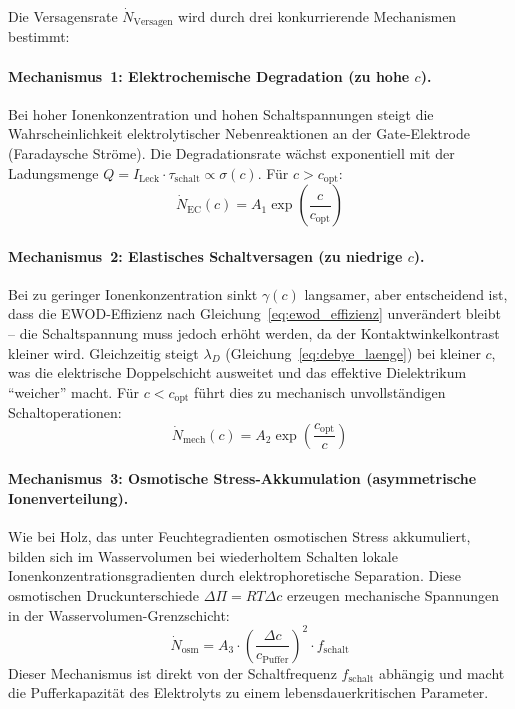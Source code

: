 ﻿\documentclass[a4paper,12pt]{scrreprt}
\theoremstyle{definition}
\begin{document}
Die Versagensrate $\dot{N}_{\mathrm{Versagen}}$ wird durch drei konkurrierende
Mechanismen bestimmt:

\paragraph{Mechanismus~1: Elektrochemische Degradation (zu hohe $c$).}
Bei hoher Ionenkonzentration und hohen Schaltspannungen steigt die Wahrscheinlichkeit
elektrolytischer Nebenreaktionen an der Gate-Elektrode (Faradaysche Ströme).
Die Degradationsrate wächst exponentiell mit der Ladungsmenge
$Q = I_{\mathrm{Leck}} \cdot \tau_{\mathrm{schalt}} \propto \sigma(c)$. Für $c > c_{\mathrm{opt}}$:
\begin{equation}
	\dot{N}_{\mathrm{EC}}(c) = A_1 \exp\!\left(\frac{c}{c_{\mathrm{opt}}}\right)
	\label{eq:versagen_ec}
\end{equation}

\paragraph{Mechanismus~2: Elastisches Schaltversagen (zu niedrige $c$).}
Bei zu geringer Ionenkonzentration sinkt $\gamma(c)$ langsamer, aber
entscheidend ist, dass die EWOD-Effizienz nach Gleichung~\eqref{eq:ewod_effizienz}
unverändert bleibt -- die Schaltspannung muss jedoch erhöht werden, da
der Kontaktwinkelkontrast kleiner wird. Gleichzeitig steigt $\lambda_D$
(Gleichung~\eqref{eq:debye_laenge}) bei kleiner $c$, was die elektrische
Doppelschicht ausweitet und das effektive Dielektrikum ``weicher'' macht.
Für $c < c_{\mathrm{opt}}$ führt dies zu mechanisch unvollständigen
Schaltoperationen:
\begin{equation}
	\dot{N}_{\mathrm{mech}}(c) = A_2 \exp\!\left(\frac{c_{\mathrm{opt}}}{c}\right)
	\label{eq:versagen_mech}
\end{equation}

\paragraph{Mechanismus~3: Osmotische Stress-Akkumulation (asymmetrische Ionenverteilung).}
Wie bei Holz, das unter Feuchtegradienten osmotischen Stress akkumuliert,
bilden sich im Wasservolumen bei wiederholtem Schalten lokale
Ionenkonzentrationsgradienten durch elektrophoretische Separation.
Diese osmotischen Druckunterschiede $\Delta \Pi = RT \Delta c$ erzeugen
mechanische Spannungen in der Wasservolumen-Grenzschicht:
\begin{equation}
	\dot{N}_{\mathrm{osm}} = A_3 \cdot \left(\frac{\Delta c}{c_{\mathrm{Puffer}}}\right)^2
	\cdot f_{\mathrm{schalt}}
	\label{eq:versagen_osm}
\end{equation}
Dieser Mechanismus ist direkt von der Schaltfrequenz $f_{\mathrm{schalt}}$
abhängig und macht die Pufferkapazität des Elektrolyts zu einem
lebensdauerkritischen Parameter.
\end{document}
